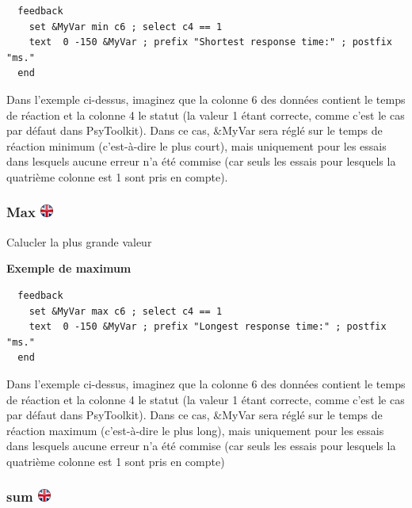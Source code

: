 \documentclass[
]{book}
\begin{document}
\begin{verbatim}
  feedback
    set &MyVar min c6 ; select c4 == 1
    text  0 -150 &MyVar ; prefix "Shortest response time:" ; postfix "ms."
  end
\end{verbatim}

Dans l'exemple ci-dessus, imaginez que la colonne 6 des données contient le temps de réaction et la colonne 4 le statut (la valeur 1 étant correcte, comme c'est le cas par défaut dans PsyToolkit). Dans ce cas, \&MyVar sera réglé sur le temps de réaction minimum (c'est-à-dire le plus court), mais uniquement pour les essais dans lesquels aucune erreur n'a été commise (car seuls les essais pour lesquels la quatrième colonne est 1 sont pris en compte).

\hypertarget{max}{%
\subsubsection[Max ]{\texorpdfstring{Max \href{https://www.psytoolkit.org/doc3.1.0/feedback.html\#_max}{\protect\includegraphics{img/ukflag.png}}}{Max }}\label{max}}

Calucler la plus grande valeur

\textbf{Exemple de maximum}

\begin{verbatim}
  feedback
    set &MyVar max c6 ; select c4 == 1
    text  0 -150 &MyVar ; prefix "Longest response time:" ; postfix "ms."
  end
\end{verbatim}

Dans l'exemple ci-dessus, imaginez que la colonne 6 des données contient le temps de réaction et la colonne 4 le statut (la valeur 1 étant correcte, comme c'est le cas par défaut dans PsyToolkit). Dans ce cas, \&MyVar sera réglé sur le temps de réaction maximum (c'est-à-dire le plus long), mais uniquement pour les essais dans lesquels aucune erreur n'a été commise (car seuls les essais pour lesquels la quatrième colonne est 1 sont pris en compte)

\hypertarget{sum}{%
\subsubsection[sum ]{\texorpdfstring{sum \href{https://www.psytoolkit.org/doc3.1.0/feedback.html\#_sum}{\protect\includegraphics{img/ukflag.png}}}{sum }}\label{sum}}
\end{document}
